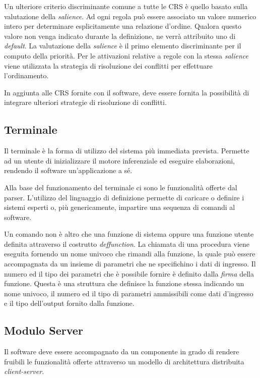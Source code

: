 Un ulteriore criterio discriminante comune a tutte le CRS è quello basato sulla valutazione della \emph{salience}. Ad ogni regola può essere associato un valore numerico intero per determinare esplicitamente una relazione d'ordine. Qualora questo valore non venga indicato durante la definizione, ne verrà attribuito uno di \emph{default}. La valutazione della \emph{salience} è il primo elemento discriminante per il computo della priorità. Per le attivazioni relative a regole con la stessa \emph{salience} viene utilizzata la strategia di risoluzione dei conflitti per effettuare l'ordinamento.

In aggiunta alle CRS fornite con il software, deve essere fornita la possibilità di integrare ulteriori strategie di risoluzione di conflitti.

\subsection{Terminale}\label{par:terminale}

Il terminale è la forma di utilizzo del sistema più immediata prevista. Permette ad un utente di inizializzare il motore inferenziale ed eseguire elaborazioni, rendendo il software un'applicazione a sé. 

Alla base del funzionamento del terminale ci sono le funzionalità offerte dal parser. L'utilizzo del linguaggio di definizione permette di caricare o definire i sistemi esperti o, più genericamente, impartire una sequenza di comandi al software.

Un comando non è altro che una funzione di sistema oppure una funzione utente definita attraverso il costrutto \emph{deffunction}. La chiamata di una procedura viene eseguita fornendo un nome univoco che rimandi alla funzione, la quale può essere accompagnata da un insieme di parametri che ne specifichino i dati di ingresso. Il numero ed il tipo dei parametri che è possibile fornire è definito dalla \emph{firma} della funzione. Questa è una struttura che definisce la funzione stessa indicando un nome univoco, il numero ed il tipo di parametri ammissibili come dati d'ingresso e il tipo dell'output fornito dalla funzione.

\subsection{Modulo Server}\label{par:server}

Il software deve essere accompagnato da un componente in grado di rendere fruibili le funzionalità offerte attraverso un modello di architettura distribuita \emph{client-server}.

